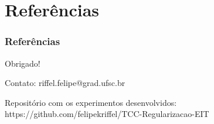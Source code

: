 \documentclass{beamer}
\begin{document}
\section{Referências}
\begin{frame}
\tableofcontents[currentsection]
\end{frame}

\begin{frame}
\frametitle{Referências}
\vspace{-2em}
\scriptsize

    
\end{frame}

\begin{frame}

\begin{center}
\Large Obrigado!
\end{center}

\vspace{1em}
Contato: riffel.felipe@grad.ufsc.br 

Repositório com os experimentos desenvolvidos: https://github.com/felipekriffel/TCC-Regularizacao-EIT
    
\end{frame}
\end{document}
